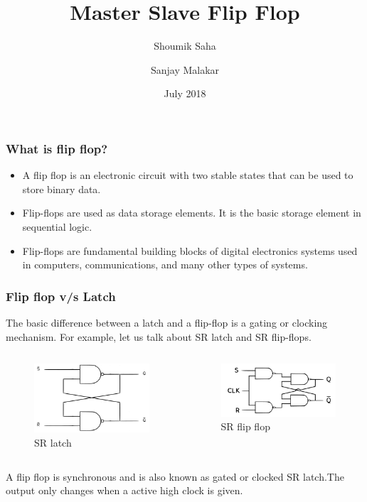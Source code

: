 \documentclass{beamer}
\title{Master Slave Flip Flop}
\author{Shoumik Saha\inst{1} \and Sanjay Malakar\inst{2} }
\institute %
{
  \inst{1}%
  1505059
  \and
  \inst{2}%
  1505057
}
\date{July 2018}
\begin{document}
\frame{\titlepage}


\begin{frame}
\frametitle{What is flip flop?}
\begin{itemize}
 \item<1-> A flip flop is an electronic circuit with two stable states that can be used to store binary data.
 \item<2->  Flip-flops are used as data storage elements. It is the basic storage element in sequential logic.
 \item<3->  Flip-flops are fundamental building blocks of digital electronics systems used in computers, communications, and many other types of systems.
\end{itemize}
\end{frame}


\begin{frame}
\frametitle{Flip flop v/s Latch}

The basic difference between a latch and a flip-flop is a gating or clocking mechanism. For example, let us talk about SR latch and SR flip-flops.\pause
\begin{columns}
\begin{figure}[h]
    \includegraphics[scale=.033]{srl.png}
    \caption{SR latch}
\end{figure}

 
\begin{figure}[h]
    \includegraphics[scale=.033]{srff.png}
    \caption{SR flip flop}
\end{figure}
\end{columns}\pause
A flip flop is synchronous and is also known as gated or clocked SR latch.The output only changes when a active high clock is given.
\end{frame}
\end{document}

